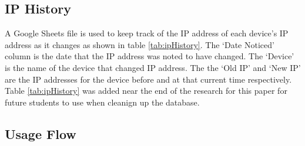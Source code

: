 \subsection{IP History}
\label{IP History}
A Google Sheets file is used to keep track of the IP address of each device's IP address as it changes as shown in table \ref{tab:ipHistory}. The `Date Noticed' column is the date that the IP address was noted to have changed. The `Device' is the name of the device that changed IP address. The the `Old IP' and `New IP' are the IP addresses for the device before and at that current time respectively. Table \ref{tab:ipHistory} was added near the end of the research for this paper for future students to use when cleanign up the database.

\begin{table}[H]
    \centering
    \caption{History of IP addresses for each device}
    \label{tab:ipHistory}
\end{table}


\subsection{Usage Flow}

